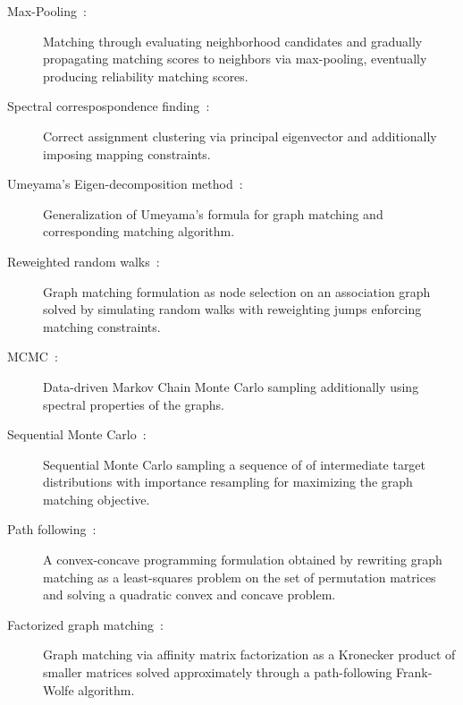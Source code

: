 \begin{description}
\item[Max-Pooling~\cite{cho2014finding}:]
    Matching through evaluating neighborhood candidates and gradually propagating matching scores to neighbors via max-pooling, eventually producing reliability matching scores.
\item[Spectral correspospondence finding~\cite{leordeanu2005spectral}:]
    Correct assignment clustering via principal eigenvector and additionally imposing mapping constraints.
\item[Umeyama's Eigen-decomposition method~\cite{zhao2007using}:]
    Generalization of Umeyama's formula for graph matching and corresponding matching algorithm.
\item[Reweighted random walks~\cite{cho2010reweighted}:]
    Graph matching formulation as node selection on an association graph solved by simulating random walks with reweighting jumps enforcing matching constraints.
\item[MCMC~\cite{lee2010graph}:]
    Data-driven Markov Chain Monte Carlo sampling additionally using spectral properties of the graphs.
\item[Sequential Monte Carlo~\cite{suh2012graph}:]
    Sequential Monte Carlo sampling a sequence of of intermediate target distributions with importance resampling for maximizing the graph matching objective.
\item[Path following~\cite{zaslavskiy2008path}:]
    A convex-concave programming formulation obtained by rewriting graph matching as a least-squares problem on the set of permutation matrices and solving a quadratic convex and concave problem.
\item[Factorized graph matching~\cite{zhou2015factorized}:]
Graph matching via affinity matrix factorization as a Kronecker product of smaller matrices solved approximately through a path-following Frank-Wolfe algorithm.
\end{description}
